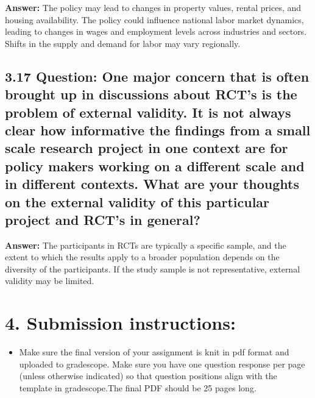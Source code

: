 \documentclass[
]{article}
\providecommand{\tightlist}{%
  \setlength{\itemsep}{0pt}\setlength{\parskip}{0pt}}
\begin{document}
\textbf{Answer:} The policy may lead to changes in property values,
rental prices, and housing availability. The policy could influence
national labor market dynamics, leading to changes in wages and
employment levels across industries and sectors. Shifts in the supply
and demand for labor may vary regionally.

\clearpage

\hypertarget{question-one-major-concern-that-is-often-brought-up-in-discussions-about-rcts-is-the-problem-of-external-validity.-it-is-not-always-clear-how-informative-the-findings-from-a-small-scale-research-project-in-one-context-are-for-policy-makers-working-on-a-different-scale-and-in-different-contexts.-what-are-your-thoughts-on-the-external-validity-of-this-particular-project-and-rcts-in-general}{%
\subsection{\texorpdfstring{3.17 \textbf{Question: One major concern
that is often brought up in discussions about RCT's is the problem of
external validity. It is not always clear how informative the findings
from a small scale research project in one context are for policy makers
working on a different scale and in different contexts. What are your
thoughts on the external validity of this particular project and RCT's
in general?
}}{3.17 Question: One major concern that is often brought up in discussions about RCT's is the problem of external validity. It is not always clear how informative the findings from a small scale research project in one context are for policy makers working on a different scale and in different contexts. What are your thoughts on the external validity of this particular project and RCT's in general? }}\label{question-one-major-concern-that-is-often-brought-up-in-discussions-about-rcts-is-the-problem-of-external-validity.-it-is-not-always-clear-how-informative-the-findings-from-a-small-scale-research-project-in-one-context-are-for-policy-makers-working-on-a-different-scale-and-in-different-contexts.-what-are-your-thoughts-on-the-external-validity-of-this-particular-project-and-rcts-in-general}}

\textbf{Answer:} The participants in RCTs are typically a specific
sample, and the extent to which the results apply to a broader
population depends on the diversity of the participants. If the study
sample is not representative, external validity may be limited.

\hypertarget{submission-instructions}{%
\section{4. Submission instructions:}\label{submission-instructions}}

\begin{itemize}
\tightlist
\item
  Make sure the final version of your assignment is knit in pdf format
  and uploaded to gradescope. Make sure you have one question response
  per page (unless otherwise indicated) so that question positions align
  with the template in gradescope.The final PDF should be 25 pages long.
\end{itemize}
\end{document}
